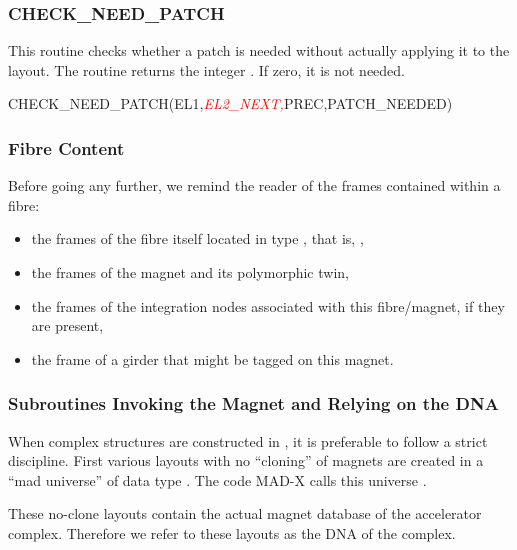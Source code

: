 \subsubsection*{CHECK\_NEED\_PATCH}

%
This routine checks whether a patch is needed without actually applying
it to the layout. The routine returns the integer .
If zero, it is not needed.

\begin{ptccode}
CHECK_NEED_PATCH(EL1,\textit{\textcolor{red}{EL2_NEXT,}}PREC,PATCH_NEEDED)
\end{ptccode}


\subsubsection{Fibre Content}

Before going any further, we remind the reader of the frames contained
within a fibre:
\begin{itemize}
  \item the frames of the fibre itself located in type , that is, ,
  \item the frames of the magnet  and its polymorphic twin,
  \item the frames of the integration nodes associated with this fibre/magnet,
if they are present,
  \item the frame of a girder that might be tagged on this magnet.
\end{itemize}


\subsubsection{Subroutines Invoking the Magnet and Relying on the DNA}

%
When complex structures are constructed in \PTC, it is preferable to follow
a strict discipline. First various layouts with no ``cloning'' of magnets are created
in a ``mad universe'' of data type . The code MAD-X calls this
universe .

%
These no-clone layouts contain the actual magnet database of the accelerator
complex. Therefore we refer to these layouts as the DNA of the complex.

